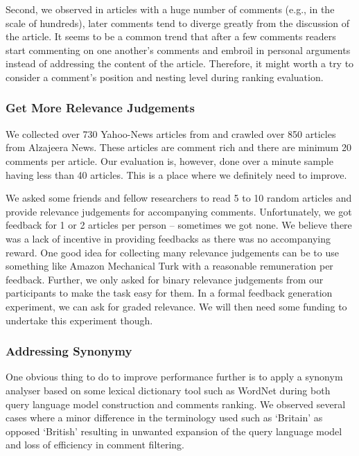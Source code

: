 \documentclass[article]{IEEEtran}
\begin{document}
Second, we observed in articles with a huge number of comments (e.g., in the scale of hundreds), later comments tend to diverge greatly from the discussion of the article. It seems to be a common trend that after a few comments readers start commenting on one another's comments and embroil in personal arguments instead of addressing the content of the article. Therefore, it might worth a try to consider a comment's position and nesting level during ranking evaluation.            

\subsubsection{Get More Relevance Judgements}
We collected over 730 Yahoo-News articles from \cite{Das:2014:GBC:2556195.2556231} and crawled over 850 articles from Alzajeera News. These articles are comment rich and there are minimum 20 comments per article. Our evaluation is, however, done over a minute sample having less than 40 articles. This is a place where we definitely need to improve.  

We asked some friends and fellow researchers to read 5 to 10 random articles and provide relevance judgements for accompanying comments. Unfortunately, we got feedback for 1 or 2 articles per person -- sometimes we got none. We believe there was a lack of incentive in providing feedbacks as there was no accompanying reward. One good idea for collecting many relevance judgements can be to use something like Amazon Mechanical Turk with a reasonable remuneration per feedback. Further, we only asked for binary relevance judgements from our participants to make the task easy for them. In a formal feedback generation experiment, we can ask for graded relevance. We will then need some funding to undertake this experiment though.    

\subsubsection{Addressing Synonymy}
One obvious thing to do to improve performance further is to apply a synonym analyser based on some lexical dictionary tool such as WordNet \cite{Miller:1995:WLD:219717.219748} during both query language model construction and comments ranking. We observed several cases where a minor difference in the terminology used such as `Britain' as opposed `British' resulting in unwanted expansion of the query language model and loss of efficiency in comment filtering.    
\end{document}
